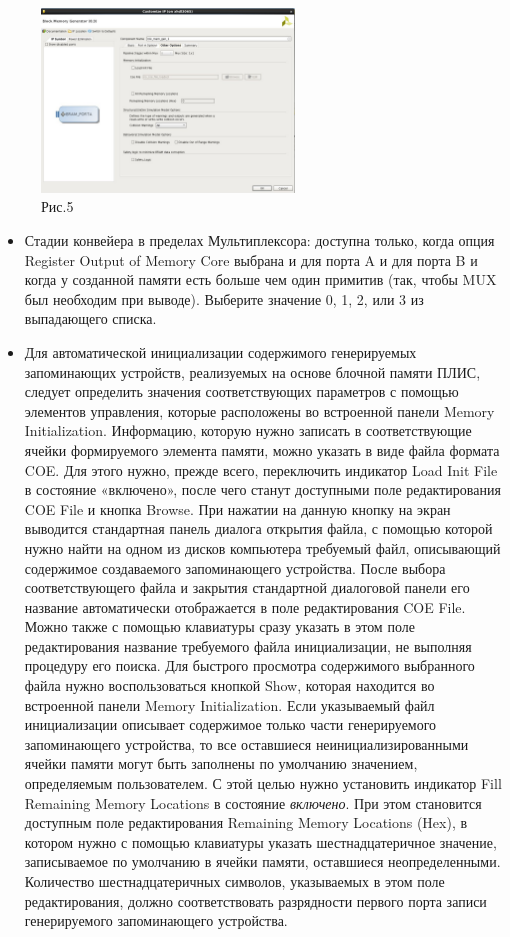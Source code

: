 \begin{figure}[h]
\centering
\includegraphics[width=0.6\textwidth]{5}
\caption{Рис.5}
\label{5_label}
\end{figure}

\begin{itemize}
\item Стадии конвейера в пределах Мультиплексора: доступна только, когда опция Register Output of Memory Core выбрана и для порта A и для порта B и когда у созданной памяти есть больше чем один примитив (так, чтобы MUX был необходим при выводе). Выберите значение 0, 1, 2, или 3 из выпадающего списка.
\item Для автоматической инициализации содержимого генерируемых запоминающих устройств, реализуемых на основе блочной памяти ПЛИС, следует определить значения соответствующих параметров с помощью элементов управления, которые расположены во встроенной панели Memory Initialization. Информацию, которую нужно записать в соответствующие ячейки формируемого элемента памяти, можно указать в виде файла формата COE. Для этого нужно, прежде всего, переключить индикатор Load Init File в состояние «включено», после чего станут доступными поле редактирования COE File и кнопка Browse. При нажатии на данную кнопку на экран выводится стандартная панель диалога открытия файла, с помощью которой нужно найти на одном из дисков компьютера требуемый файл, описывающий содержимое создаваемого запоминающего устройства. После выбора соответствующего файла и закрытия стандартной диалоговой панели его название автоматически отображается в поле редактирования COE File. Можно также с помощью клавиатуры сразу указать в этом поле редактирования название требуемого файла инициализации, не выполняя процедуру его поиска. Для быстрого просмотра содержимого выбранного файла нужно воспользоваться кнопкой Show, которая находится во встроенной панели Memory Initialization. Если указываемый файл инициализации описывает содержимое только части генерируемого запоминающего устройства, то все оставшиеся неинициализированными ячейки памяти могут быть заполнены по умолчанию значением, определяемым пользователем. С этой целью нужно установить индикатор Fill Remaining Memory Locations в состояние \emph {включено}. При этом становится доступным поле редактирования Remaining Memory Locations (Hex), в котором нужно с помощью клавиатуры указать шестнадцатеричное значение, записываемое по умолчанию в ячейки памяти, оставшиеся неопределенными. Количество шестнадцатеричных символов, указываемых в этом поле редактирования, должно соответствовать разрядности первого порта записи генерируемого запоминающего устройства. 

\end{itemize}
